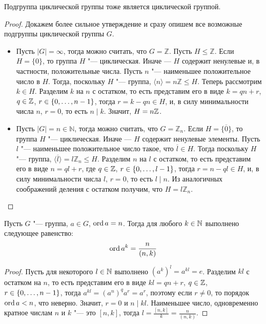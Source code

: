 \begin{theorem}
	Подгруппа циклической группы тоже является циклической группой.
\end{theorem}

\begin{proof}
	Докажем более сильное утверждение и сразу опишем все возможные подгруппы циклической группы $G$.
	\begin{itemize}
		\item Пусть $|G| = \infty$, тогда можно считать, что $G = \mathbb{Z}$. Пусть $H \le \mathbb{Z}$. Если $H = \{0\}$, то группа $H$ "--- циклическая. Иначе --- $H$ содержит ненулевые и, в частности, положительные числа. Пусть $n$ "--- наименьшее положительное число в $H$. Тогда, поскольку $H$ "--- группа, $\langle n \rangle = n\mathbb{Z} \le H$. Теперь рассмотрим $k \in H$. Разделим $k$ на $n$ с остатком, то есть представим его в виде $k = qn + r$, $q \in \mathbb{Z}$, $r \hm{\in} \{0, \dots, n-1\}$, тогда $r = k - qn \in H$, и, в силу минимальности числа $n$, $r = 0$, то есть $n \mid k$. Значит, $H = n\mathbb{Z}$.
		
		\item Пусть $|G| = n \in \mathbb{N}$, тогда можно считать, что $G = \mathbb{Z}_n$. Если $H = \{\overline 0\}$, то группа $H$ "--- циклическая. Иначе --- $H$ содержит ненулевые элементы. Пусть $l$ "--- наименьшее положительное число такое, что $\overline l \in H$. Тогда поскольку $H$ "--- группа, $\langle \overline l \rangle = l\mathbb{Z}_n \le H$. Разделим $n$ на $l$ с остатком, то есть представим его в виде $n = ql + r$, где $q \in \mathbb{Z}$, $r \hm{\in} \{0, \dots, l-1\}$, тогда $r = n - ql \in H$, и, в силу минимальности числа $l$, $r = 0$, то есть $l \mid n$. Из аналогичных соображений деления с остатком получим, что $H = l\mathbb{Z}_n$.\qedhere
	\end{itemize}
\end{proof}

\begin{proposition}
	Пусть $G$ "--- группа, $a \in G$, $\operatorname{ord}{a} = n$. Тогда для любого $k \in \mathbb{N}$ выполнено следующее равенство:
	\[\operatorname{ord}{a^k} = \frac{n}{(n, k)}\]
\end{proposition}

\begin{proof}
	Пусть для некоторого $l \in \mathbb{N}$ выполнено $(a^k)^l = a^{kl} = e$. Разделим $kl$ с остатком на $n$, то есть представим его в виде $kl = qn + r$, $q \in \mathbb{Z}$, $r \hm{\in} \{0, \dots, n-1\}$, тогда $a^{kl} = (a^{n})^qa^r = a^r$, поэтому если $r \ne 0$, то порядок $\operatorname{ord}{a} < n$, что неверно. Значит, $r = 0$ и $n \mid kl$. Наименьшее число, одновременно кратное числам $n$ и $k$ "--- это $[n, k]$, тогда $l = \frac{[n, k]}{k} = \frac{n}{(n, k)}$.
\end{proof}

